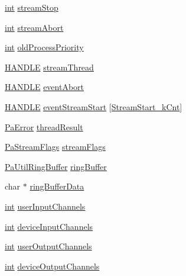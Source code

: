 \begin{DoxyCompactItemize}
\item 
\hyperlink{xmltok_8h_a5a0d4a5641ce434f1d23533f2b2e6653}{int} \hyperlink{struct_____pa_win_wdm_stream_a970f778b68693673b00fedf8ff4f201d}{stream\+Stop}
\item 
\hyperlink{xmltok_8h_a5a0d4a5641ce434f1d23533f2b2e6653}{int} \hyperlink{struct_____pa_win_wdm_stream_acaa0f377d2148764a2c6dd97c75e87d7}{stream\+Abort}
\item 
\hyperlink{xmltok_8h_a5a0d4a5641ce434f1d23533f2b2e6653}{int} \hyperlink{struct_____pa_win_wdm_stream_a0ab2edba0df711bbda00f8030f290db0}{old\+Process\+Priority}
\item 
\hyperlink{_sound_touch_d_l_l_8h_aa8c0374618b33785ccb02f74bcfebc46}{H\+A\+N\+D\+LE} \hyperlink{struct_____pa_win_wdm_stream_a696e6c139cc0dfad91ab108dbf446a12}{stream\+Thread}
\item 
\hyperlink{_sound_touch_d_l_l_8h_aa8c0374618b33785ccb02f74bcfebc46}{H\+A\+N\+D\+LE} \hyperlink{struct_____pa_win_wdm_stream_a2ec042a491ca1d0d8a071f4c4901e4c4}{event\+Abort}
\item 
\hyperlink{_sound_touch_d_l_l_8h_aa8c0374618b33785ccb02f74bcfebc46}{H\+A\+N\+D\+LE} \hyperlink{struct_____pa_win_wdm_stream_a03f53464c73a442fdb86f340fe54e369}{event\+Stream\+Start} \mbox{[}\hyperlink{pa__win__wdmks_8c_abf83566c082ff992efb67a6a533c7ec5a015288f4751df2a3c5680952db2ebc97}{Stream\+Start\+\_\+k\+Cnt}\mbox{]}
\item 
\hyperlink{portaudio_8h_a4949e4a8ef9f9dbe8cbee414ce69841d}{Pa\+Error} \hyperlink{struct_____pa_win_wdm_stream_a3fde31efa009b90dc634e4cb24507976}{thread\+Result}
\item 
\hyperlink{portaudio_8h_a37c7ac3ace7d2dd1430f40ecdee4ebb6}{Pa\+Stream\+Flags} \hyperlink{struct_____pa_win_wdm_stream_a515c790a2cfb6e012e152dc1713feb5c}{stream\+Flags}
\item 
\hyperlink{struct_pa_util_ring_buffer}{Pa\+Util\+Ring\+Buffer} \hyperlink{struct_____pa_win_wdm_stream_adece2546e5f0f11c92aa5ddd757bc251}{ring\+Buffer}
\item 
char $\ast$ \hyperlink{struct_____pa_win_wdm_stream_aad0c5a37686d5d36e970628c720348fd}{ring\+Buffer\+Data}
\item 
\hyperlink{xmltok_8h_a5a0d4a5641ce434f1d23533f2b2e6653}{int} \hyperlink{struct_____pa_win_wdm_stream_ac89b1708e9a4877523c85ed6961d4fe7}{user\+Input\+Channels}
\item 
\hyperlink{xmltok_8h_a5a0d4a5641ce434f1d23533f2b2e6653}{int} \hyperlink{struct_____pa_win_wdm_stream_ae9c3eec995fc49fa3fadb925430b359c}{device\+Input\+Channels}
\item 
\hyperlink{xmltok_8h_a5a0d4a5641ce434f1d23533f2b2e6653}{int} \hyperlink{struct_____pa_win_wdm_stream_a4d0bdb5754a747c2be09c7a3829efa9c}{user\+Output\+Channels}
\item 
\hyperlink{xmltok_8h_a5a0d4a5641ce434f1d23533f2b2e6653}{int} \hyperlink{struct_____pa_win_wdm_stream_aea3f97d4daebbcf1865bcce7103e5e1b}{device\+Output\+Channels}
\end{DoxyCompactItemize}



